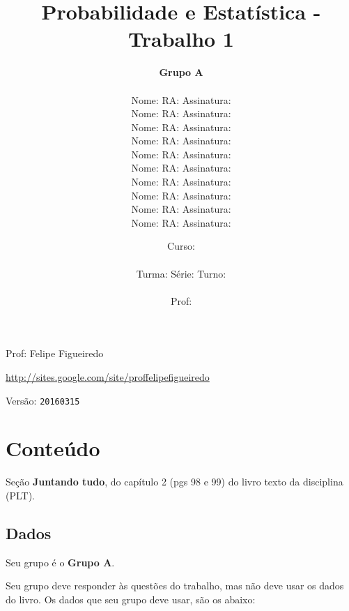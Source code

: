 \documentclass[a4paper]{article}
\date{
\bigskip
Curso: \underline{\hspace{8cm}}\\
\ \\
Turma: \underline{\hspace{1cm}} Série: \underline{\hspace{1cm}} Turno:
\underline{\hspace{1cm}}\\
\ \\
Prof: \underline{\hspace{8cm}}\\
}
\title{Probabilidade e Estatística - Trabalho 1}
\author{
{\bf Grupo A}\\
\ \\
Nome: \underline{\hspace{6cm}} RA: \underline{\hspace{2cm}} Assinatura: \underline{\hspace{4cm}}\\
Nome: \underline{\hspace{6cm}} RA: \underline{\hspace{2cm}} Assinatura: \underline{\hspace{4cm}}\\
Nome: \underline{\hspace{6cm}} RA: \underline{\hspace{2cm}} Assinatura: \underline{\hspace{4cm}}\\
Nome: \underline{\hspace{6cm}} RA: \underline{\hspace{2cm}} Assinatura: \underline{\hspace{4cm}}\\
Nome: \underline{\hspace{6cm}} RA: \underline{\hspace{2cm}} Assinatura: \underline{\hspace{4cm}}\\
Nome: \underline{\hspace{6cm}} RA: \underline{\hspace{2cm}} Assinatura: \underline{\hspace{4cm}}\\
Nome: \underline{\hspace{6cm}} RA: \underline{\hspace{2cm}} Assinatura: \underline{\hspace{4cm}}\\
Nome: \underline{\hspace{6cm}} RA: \underline{\hspace{2cm}} Assinatura: \underline{\hspace{4cm}}\\
Nome: \underline{\hspace{6cm}} RA: \underline{\hspace{2cm}} Assinatura: \underline{\hspace{4cm}}\\
Nome: \underline{\hspace{6cm}} RA: \underline{\hspace{2cm}} Assinatura: \underline{\hspace{4cm}}\\
}
\begin{document}
\maketitle
\newpage

\parbox[c]{.825\textwidth}{\raggedright%
{Prof: Felipe Figueiredo\par}
{\url{http://sites.google.com/site/proffelipefigueiredo}\par}
}

Versão: \verb|20160315|




\section{Conteúdo}

Seção {\bf Juntando tudo}, do capítulo 2 (pgs 98 e 99) do livro texto da disciplina (PLT). 

\subsection{Dados}
Seu grupo é o {\bf Grupo A}.

Seu grupo deve responder às questões do trabalho, mas não deve usar os dados do livro. Os dados que seu grupo deve usar, são os abaixo:
\end{document}
